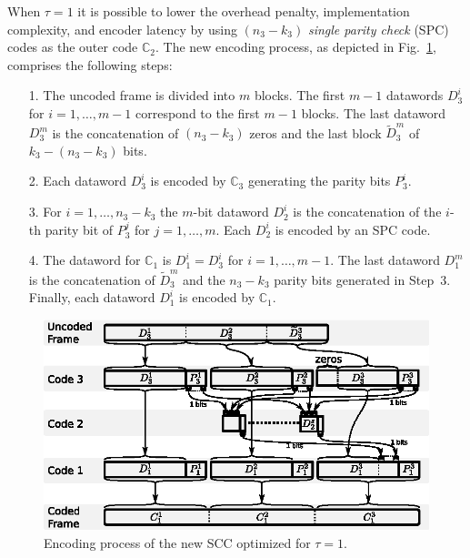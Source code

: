\documentclass[conference]{IEEEtran}
\newcommand{\C}{\mathbb{C}}  %
\newcommand{\ScaleA}{1.0} %
\begin{document}
When $\tau=1$ it is possible to lower the overhead penalty,
implementation complexity, and encoder latency by using ${(n_3-k_3)}$
\textit{single parity check} (SPC) codes as the outer code $\C_2$. The
new encoding process, as depicted in Fig.~\ref{fig:pro2enc}, comprises
the following steps:
\begin{itemize}
\item[1.] The uncoded frame is divided into $m$ blocks. The first
  $m-1$ datawords $D^i_3$ for $i=1,\ldots,m-1$ correspond to the first
  $m-1$ blocks. The last dataword $D^m_3$ is the concatenation of
  $(n_3-k_3)$ zeros and the last block $\widetilde{D}^m_3$ of
  $k_3-(n_3-k_3)$ bits.
\item[2.] Each dataword $D^i_3$ is encoded by $\C_3$ generating the
  parity bits $P^i_3$.
\item[3.] For $i=1,\ldots,n_3-k_3$ the $m$-bit dataword $D^i_2$ is the
  concatenation of the $i$-th parity bit of $P^j_3$ for
  $j=1,\ldots,m$. Each $D^i_2$ is encoded by an SPC code.
\item[4.] The dataword for $\C_1$ is $D^i_1=D^i_3$ for
  $i=1,\ldots,m-1$. The last dataword $D^m_1$ is the concatenation of
  $\widetilde{D}^m_3$ and the $n_3-k_3$ parity bits generated in
  Step~3. Finally, each dataword $D^i_1$ is encoded by $\C_1$.
\end{itemize}

\begin{figure}[t]
  \centerline{\includegraphics[width=\ScaleA\columnwidth]{figures_sources/drawing_v10_proposed_2_encoder.eps}}%
  \caption{Encoding process of the new SCC optimized for $\tau=1$.}
    \label{fig:pro2enc}
\end{figure}

\end{document}
